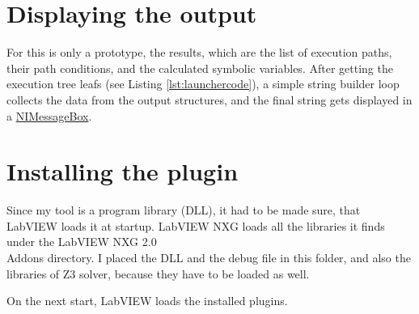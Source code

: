\section{Displaying the output}
For this is only a prototype, the results, which are the list of execution paths, their path conditions, and the calculated symbolic variables. After getting the execution tree leafs (see Listing \ref{lst:launchercode}), a simple string builder loop collects the data from the output structures, and the final string gets displayed in a \underline{NIMessageBox}.

\section{Installing the plugin}
Since my tool is a program library (DLL), it had to be made sure, that LabVIEW loads it at startup. LabVIEW NXG loads all the libraries it finds under the LabVIEW NXG 2.0\\Addons directory. I placed the DLL and the debug file in this folder, and also the libraries of Z3 solver, because they have to be loaded as well.

On the next start, LabVIEW loads the installed plugins.